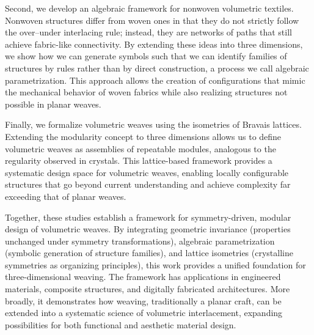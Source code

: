 Second, we develop an algebraic framework for nonwoven volumetric textiles. Nonwoven structures differ from woven ones in that they do not strictly follow the over–under interlacing rule; instead, they are networks of paths that still achieve fabric-like connectivity. By extending these ideas into three dimensions, we show how we can generate symbols such that we can identify families of structures by rules rather than by direct construction, a process we call algebraic parametrization. This approach allows the creation of configurations that mimic the mechanical behavior of woven fabrics while also realizing structures not possible in planar weaves.

Finally, we formalize volumetric weaves using the isometries of Bravais lattices. Extending the modularity concept to three dimensions allows us to define volumetric weaves as assemblies of repeatable modules, analogous to the regularity observed in crystals. This lattice-based framework provides a systematic design space for volumetric weaves, enabling locally configurable structures that go beyond current understanding and achieve complexity far exceeding that of planar weaves.

Together, these studies establish a framework for symmetry-driven, modular design of volumetric weaves. By integrating geometric invariance (properties unchanged under symmetry transformations), algebraic parametrization (symbolic generation of structure families), and lattice isometries (crystalline symmetries as organizing principles), this work provides a unified foundation for three-dimensional weaving. The framework has applications in engineered materials, composite structures, and digitally fabricated architectures. More broadly, it demonstrates how weaving, traditionally a planar craft, can be extended into a systematic science of volumetric interlacement, expanding possibilities for both functional and aesthetic material design.



